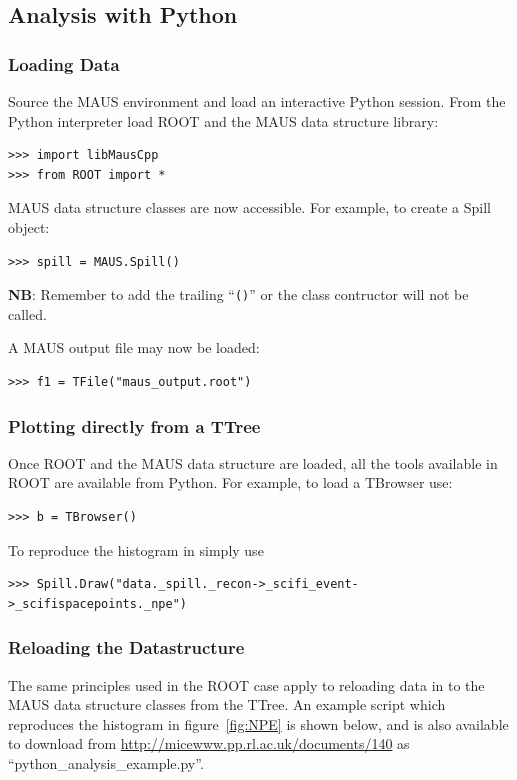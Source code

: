 \documentclass[a4paper,10pt]{article}
\begin{document}
  \subsection{Analysis with Python}
  \label{sec:PythonAnalysis}

  \subsubsection{Loading Data}
  Source the MAUS environment and load an interactive Python session.  From the Python interpreter load ROOT and the MAUS data structure library:
  \begin{lstlisting}
>>> import libMausCpp
>>> from ROOT import *
  \end{lstlisting}
  MAUS data structure classes are now accessible.  For example, to create a Spill object:
  \begin{lstlisting}
>>> spill = MAUS.Spill()
  \end{lstlisting}
  \textbf{NB}: Remember to add the trailing ``\texttt{()}'' or the class contructor will not be called.

  A MAUS output file may now be loaded:
  \begin{lstlisting}
>>> f1 = TFile("maus_output.root")
  \end{lstlisting}

  \subsubsection{Plotting directly from a TTree}
  \label{sec:PythonPlottingDirectlyFromTTree}
  Once ROOT and the MAUS data structure are loaded, all the tools available in ROOT are available from Python.  For example, to load a TBrowser use:
  \begin{lstlisting}
>>> b = TBrowser()
  \end{lstlisting}
  To reproduce the histogram in simply use
  \begin{lstlisting}
>>> Spill.Draw("data._spill._recon->_scifi_event->_scifispacepoints._npe")
  \end{lstlisting}

  \subsubsection{Reloading the Datastructure}
  \label{sec:PythonAnalysisDatastructure}
  The same principles used in the ROOT case apply to reloading data in to the MAUS data structure classes from the TTree.  An example script which reproduces the histogram in figure~\ref{fig:NPE} is shown below, and is also available to download from \url{http://micewww.pp.rl.ac.uk/documents/140} as ``python\_analysis\_example.py''.
\end{document}
